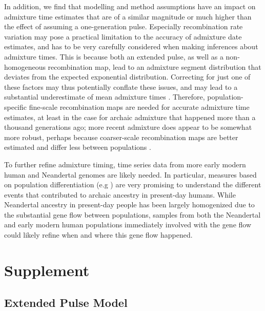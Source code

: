 \documentclass[]{article}
\begin{document}
In addition, we find that modelling and method assumptions have an impact on admixture time estimates that are of a similar magnitude or much higher than the effect of assuming a one-generation pulse. Especially recombination rate variation may pose a practical limitation to the accuracy of admixture date estimates, and has to be very carefully considered when making inferences about admixture times. This is because both an extended pulse, as well as a non-homogeneous recombination map, lead to an admixture segment distribution that deviates from the expected exponential distribution. Correcting for just one of these factors may thus potentially conflate these issues, and may lead to a substantial underestimate of mean admixture times \citep{sankararaman_date_2012}. Therefore, population-specific fine-scale recombination maps are needed for accurate admixture time estimates, at least in the case for archaic admixture that happened more than a thousand generations ago; more recent admixture does appear to be somewhat more robust, perhaps because coarser-scale recombination maps are better estimated and differ less between populations \citep{hinch_landscape_2011}. 


To further refine admixture timing, time series data from more early modern human and Neandertal genomes are likely needed. In particular, measures based on population differentiation (e.g \citep{browning_analysis_2018,wall_higher_2013,villanea_multiple_2019}) are very promising to understand the different events that contributed to archaic ancestry in present-day humans. While Neandertal ancestry in present-day people has been largely homogenized due to the substantial gene flow between populations, samples from both the Neandertal and early modern human populations immediately involved with the gene flow could likely refine when and where this gene flow happened. 







\hypertarget{refs}{}




\pagebreak
\setcounter{figure}{0} \renewcommand{\figurename}{Fig. S}
\renewcommand{\tablename}{Tab. S}

\section{Supplement}\label{supplement}

\subsection{Extended Pulse Model}
\end{document}
